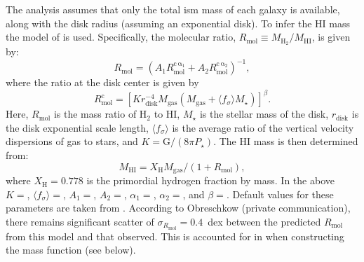 The analysis assumes that only the total \gls{ism} mass of each galaxy is available, along with the disk radius (assuming an exponential disk). To infer the HI mass the model of \cite{obreschkow_simulation_2009} is used. Specifically, the molecular ratio, $R_\mathrm{mol}\equiv M_\mathrm{H_2}/M_\mathrm{HI}$, is given by:
\begin{equation}
 R_\mathrm{mol} = \left( A_1 R_\mathrm{mol}^\mathrm{c\,\alpha_1} + A_2 R_\mathrm{mol}^\mathrm{c\,\alpha_2} \right)^{-1},
 \label{eq:HIMassSystematic}
\end{equation}
where the ratio at the disk center is given by
\begin{equation}
 R_\mathrm{mol}^\mathrm{c} = [ K r_\mathrm{disk}^{-4} M_\mathrm{gas} (M_\mathrm{gas} + \langle f_\sigma \rangle M_\star)]^\beta.
\end{equation}
Here, $R_\mathrm{mol}$ is the mass ratio of H$_2$ to HI, $M_\star$ is the stellar mass of the disk, $r_\mathrm{disk}$ is the disk exponential scale length, $\langle f_\sigma \rangle$ is the average ratio of the vertical velocity dispersions of gas to stars, and $K=\mathrm{G}/(8\pi P_\star)$. The HI mass is then determined from:
\begin{equation}
M_\mathrm{HI} = X_\mathrm{H} M_\mathrm{gas} / ( 1 + R_\mathrm{mol} ),
\end{equation}
where $X_\mathrm{H}=0.778$ is the primordial hydrogen fraction by mass. In the above $K=${\normalfont {}}, $\langle f_\sigma \rangle=${\normalfont {}}, $A_1=${\normalfont {}}, $A_2=${\normalfont {}}, $\alpha_1=${\normalfont {}}, $\alpha_2=${\normalfont {}}, and $\beta=${\normalfont {}}. Default values for these parameters are taken from \cite{obreschkow_simulation_2009}. According to Obreschkow (private communication), there remains significant scatter of $\sigma_{R_\mathrm{mol}}=0.4$~dex between the predicted $R_\mathrm{mol}$ from this model and that observed. This is accounted for in when constructing the mass function (see below).

